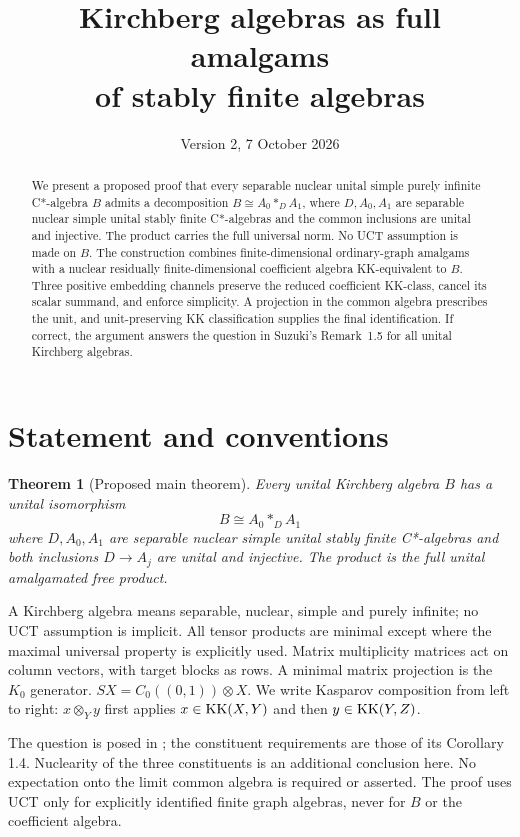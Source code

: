 \documentclass[11pt,letterpaper]{amsart}
\title[Kirchberg algebras as full amalgams]{Kirchberg algebras as full amalgams\\
of stably finite algebras}
\author{}
\date{Version 2, 7 October 2026}
\newtheorem{theorem}{Theorem}
\theoremstyle{remark}\newtheorem{remark}[theorem]{Remark}
\begin{document}
\begin{abstract}
We present a proposed proof that every separable nuclear unital simple
purely infinite C*-algebra $B$ admits a decomposition
$B\cong A_0*_D A_1$, where $D,A_0,A_1$ are separable nuclear simple
unital stably finite C*-algebras and the common inclusions are unital
and injective. The product carries the full universal norm. No UCT
assumption is made on $B$. The construction combines finite-dimensional
ordinary-graph amalgams with a nuclear residually finite-dimensional
coefficient algebra KK-equivalent to $B$. Three positive embedding
channels preserve the reduced coefficient KK-class, cancel its scalar
summand, and enforce simplicity. A projection in the common algebra
prescribes the unit, and unit-preserving KK classification supplies the
final identification. If correct, the argument answers the question in
Suzuki's Remark~1.5 for all unital Kirchberg algebras.
\end{abstract}
\maketitle
\section{Statement and conventions}
\begin{theorem}[Proposed main theorem]\label{thm:all}
Every unital Kirchberg algebra $B$ has a unital isomorphism
\[
                     B\cong A_0*_D A_1
\]
where $D,A_0,A_1$ are separable nuclear simple unital stably finite
C*-algebras and both inclusions $D\to A_j$ are unital and injective.
The product is the full unital amalgamated free product.
\end{theorem}
A Kirchberg algebra means separable, nuclear, simple and purely infinite;
no UCT assumption is implicit. All tensor products are minimal except
where the maximal universal property is explicitly used. Matrix
multiplicity matrices act on column vectors, with target blocks as rows.
A minimal matrix projection is the $K_0$ generator. $SX=C_0((0,1))\otimes X$.
We write Kasparov composition from left to right: $x\otimes_Y y$ first
applies $x\in\operatorname{KK}(X,Y)$ and then $y\in\operatorname{KK}(Y,Z)$.

The question is posed in \cite[Remark 1.5, p.~2]{Suzuki}; the constituent
requirements are those of its Corollary 1.4. Nuclearity of the three
constituents is an additional conclusion here. No expectation onto the
limit common algebra is required or asserted. The proof uses UCT only
for explicitly identified finite graph algebras, never for $B$ or the
coefficient algebra.
\end{document}
